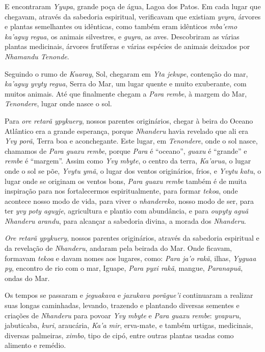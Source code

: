 E encontraram \emph{Yyupa}, grande poça de água, Lagoa dos Patos. Em
cada lugar que chegavam, através da sabedoria espiritual, verificavam
que existiam \emph{yvyra}, árvores e plantas semelhantes ou idênticas,
como também eram idênticos \emph{mba'emo ka'aguy} \emph{regua}, os
animais silvestres,{} e \emph{guyra}, as aves. Descobriram as
várias plantas medicinais, árvores frutíferas e várias espécies de
animais deixados por \emph{Nhamandu Tenonde}.

Seguindo o rumo de \emph{Kuaray}, Sol, chegaram em \emph{Yta jekupe},
contenção do mar, \emph{ka'aguy yvyty regua}, Serra do Mar, um lugar
quente e muito exuberante, com muitos animais. Até que finalmente chegam
a \emph{Para rembe}, à margem do Mar, \emph{Tenondere}, lugar onde nasce
o sol.


 

Para \emph{ore retarã ypykuery}, nossos parentes originários, chegar à
beira do Oceano Atlântico era a grande esperança, porque \emph{Nhanderu}
havia revelado que ali era \emph{Yvy porã}, Terra boa e aconchegante.
Este lugar, em \emph{Tenondere}, onde o sol nasce, chamamos de
\emph{Para guaxu rembe}, porque \emph{Para} é ``oceano'', \emph{guaxu} é
``grande'' e \emph{rembe} é ``margem''. Assim como \emph{Yvy mbyte}, o
centro da terra, \emph{Ka'arua}, o lugar onde o sol se põe, \emph{Yvytu
ymã}, o lugar dos ventos originários, frios, e \emph{Yvytu} \emph{katu},
o lugar onde se originam os ventos bons, \emph{Para guaxu rembe} também
é de muita inspiração para nos fortalecermos espiritualmente, para
formar \emph{tekoa}, onde acontece nosso modo de vida, para viver o
\emph{nhandereko}, nosso modo de ser, para ter \emph{yvy poty aguyje},
agricultura e plantio com abundância, e para \emph{oupyty aguã Nhanderu
arandu}, para alcançar a sabedoria divina, a morada dos \emph{Nhanderu}.

\emph{Ore retarã ypykuery}, nossos parentes originários, através da
sabedoria espiritual e da revelação de \emph{Nhanderu}, andaram pela
beirada do Mar. Onde ficavam, formavam \emph{tekoa} e davam nomes aos
lugares, como: \emph{Para ja'o rakã}, ilhas, \emph{Yyguaa py}, encontro
de rio com o mar, Iguape, \emph{Para pyxi rakã}, mangue,
\emph{Paranapuã}, ondas do Mar.


 

Os tempos se passaram e \emph{jeguakava} e \emph{jaxukava porãgue'i}
continuaram a realizar suas longas caminhadas, levando, trazendo e
plantando diversas sementes e criações de \emph{Nhanderu} para povoar
\emph{Yvy mbyte} e \emph{Para guaxu rembe}: \emph{yvapuru}, jabuticaba,
\emph{kuri}, araucária, \emph{Ka'a mir}, erva-mate, e também urtigas,
medicinais, diversas palmeiras, \emph{ximbo}, tipo de cipó, entre outras
plantas usadas como alimento e remédio.


